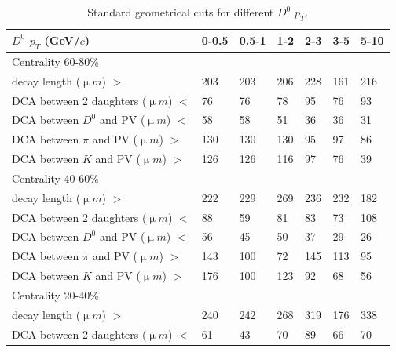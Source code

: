 \begin{table}[htp]
  \centering
  \caption{Standard geometrical cuts for different $D^0$ $p_T$.}
  \label{geometryCutsTight}
  \begin{center}
    \begin{tabular}{l|l|l|l|l|l|l}
      $D^0$ $p_T$ (GeV/$c$) & 0-0.5 & 0.5-1 & 1-2 & 2-3 & 3-5 & 5-10\\ \hline
      Centrality  60-80\% & &  & &  & & \\ \hline
      decay length (${\upmu}m$) $>$ & 203 & 203 & 206 & 228 & 161 & 216\\ \hline
      DCA between 2 daughters (${\upmu}m$) $<$ & 76 & 76 & 78 & 95 & 76 & 93\\ \hline
      DCA between $D^0$ and PV (${\upmu}m$) $<$ & 58 & 58 & 51 & 36 & 36 & 31\\ \hline
      DCA between $\pi$ and PV (${\upmu}m$) $>$ & 130 & 130 & 130 & 95 & 97 & 86\\ \hline
      DCA between $K$ and PV (${\upmu}m$) $>$ & 126 & 126 & 116 & 97 & 76 & 39\\ \hline
      Centrality  40-60\% &  &  &  &  & & \\ \hline
      decay length (${\upmu}m$) $>$ & 222 & 229 & 269 & 236 & 232 & 182\\ \hline
      DCA between 2 daughters (${\upmu}m$) $<$ & 88 & 59 & 81 & 83 & 73 & 108\\ \hline
      DCA between $D^0$ and PV (${\upmu}m$) $<$ & 56 & 45 & 50 & 37 & 29 & 26\\ \hline
      DCA between $\pi$ and PV (${\upmu}m$) $>$ & 143 & 100 & 72 & 145 & 113 & 95\\ \hline
      DCA between $K$ and PV (${\upmu}m$) $>$ & 176 & 100 & 123 & 92 & 68 & 56\\ \hline
      Centrality  20-40\% &  &  &  &  & & \\ \hline
      decay length (${\upmu}m$) $>$ & 240 & 242 & 268 & 319 & 176 & 338\\ \hline
      DCA between 2 daughters (${\upmu}m$) $<$ & 61 & 43 & 70 & 89 & 66 & 70\\ \hline

\end{tabular}
\end{center}
\end{table}
